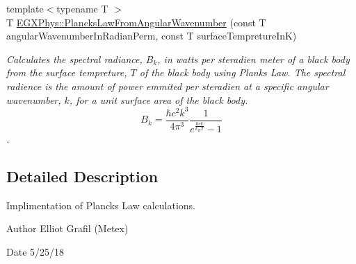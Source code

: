 \begin{DoxyCompactItemize}
{\footnotesize template$<$typename T $>$ }\\T \mbox{\hyperlink{group___e_g_x_phys-_electrodynamics-_black_body-_plancks_law_gaa3d3e0fdb77d25bdd40523f9975de902}{E\+G\+X\+Phys\+::\+Plancks\+Law\+From\+Angular\+Wavenumber}} (const T angular\+Wavenumber\+In\+Radian\+Perm, const T surface\+Tempreture\+InK)
\begin{DoxyCompactList}\small\item\em Calculates the spectral radiance, $B_{k}$, in watts per steradien meter of a black body from the surface tempreture, $T$ of the black body using Plank\textquotesingle{}s Law. The spectral radience is the amount of power emmited per steradien at a specific angular wavenumber, $k$, for a unit surface area of the black body. \[ B_{k} = \dfrac{\hbar c^2 k^3}{4\pi^3} \dfrac{1}{e^{\frac{\hbar c k}{k_B T}} - 1} \]. \end{DoxyCompactList}\end{DoxyCompactItemize}


\subsection{Detailed Description}
Implimentation of Planck\textquotesingle{}s Law calculations. 

\begin{DoxyAuthor}{Author}
Elliot Grafil (Metex) 
\end{DoxyAuthor}
\begin{DoxyDate}{Date}
5/25/18 
\end{DoxyDate}

